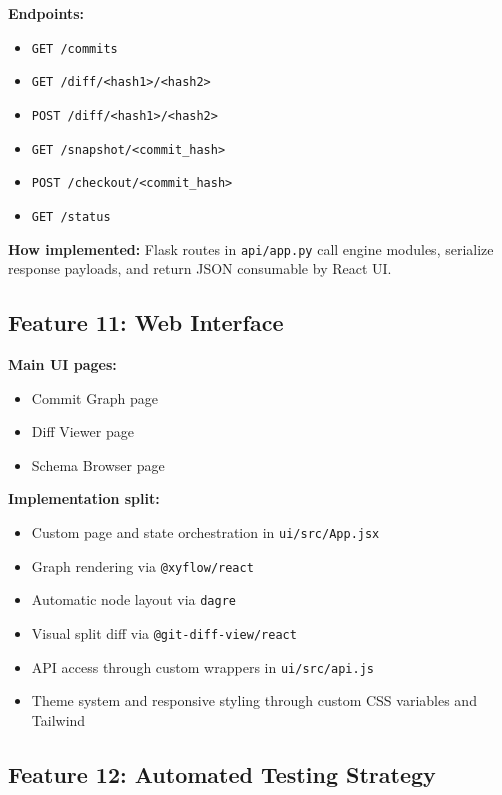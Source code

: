 \documentclass[12pt, a4paper]{article}
\begin{document}
\textbf{Endpoints:}
\begin{itemize}[leftmargin=1.5em]
    \item \texttt{GET /commits}
    \item \texttt{GET /diff/<hash1>/<hash2>}
    \item \texttt{POST /diff/<hash1>/<hash2>}
    \item \texttt{GET /snapshot/<commit\_hash>}
    \item \texttt{POST /checkout/<commit\_hash>}
    \item \texttt{GET /status}
\end{itemize}

\textbf{How implemented:}
Flask routes in \texttt{api/app.py} call engine modules, serialize response payloads,
and return JSON consumable by React UI.

\subsection{Feature 11: Web Interface}

\textbf{Main UI pages:}
\begin{itemize}[leftmargin=1.5em]
    \item Commit Graph page
    \item Diff Viewer page
    \item Schema Browser page
\end{itemize}

\textbf{Implementation split:}
\begin{itemize}[leftmargin=1.5em]
    \item Custom page and state orchestration in \texttt{ui/src/App.jsx}
    \item Graph rendering via \texttt{@xyflow/react}
    \item Automatic node layout via \texttt{dagre}
    \item Visual split diff via \texttt{@git-diff-view/react}
    \item API access through custom wrappers in \texttt{ui/src/api.js}
    \item Theme system and responsive styling through custom CSS variables and Tailwind
\end{itemize}

\subsection{Feature 12: Automated Testing Strategy}
\end{document}
